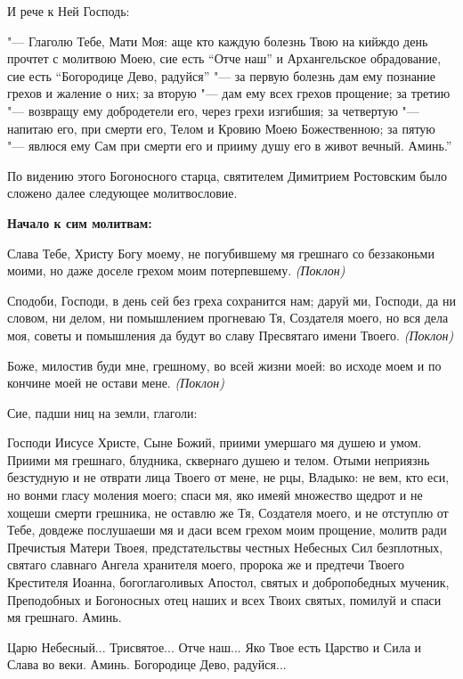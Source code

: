И рече к Ней Господь:


"--- Глаголю Тебе, Мати Моя: аще кто каждую болезнь Твою на кийждо день прочтет с молитвою Моею, сие есть “Отче наш” и Архангельское обрадование, сие есть “Богородице Дево, радуйся” "--- за первую болезнь дам ему познание грехов и жаление о них; за вторую "--- дам ему всех грехов прощение; за третию "--- возвращу ему добродетели его, через грехи изгибшия; за четвертую "--- напитаю его, при смерти его, Телом и Кровию Моею Божественною; за пятую "--- явлюся ему Сам при смерти его и прииму душу его в живот вечный. Аминь.”


По видению этого Богоносного старца, святителем Димитрием Ростовским было сложено далее следующее молитвословие.


\medskip


\bfseries Начало к сим   молитвам:\normalfont{}\nopagebreak


Слава Тебе, Христу Богу моему, не погубившему мя грешнаго со беззаконьми моими, но даже доселе грехом моим потерпевшему. \itshape (Поклон)

\normalfont{}Сподоби, Господи, в день сей без греха сохранится нам; даруй ми, Господи, да ни словом, ни делом, ни помышлением прогневаю Тя, Создателя моего, но вся дела моя, советы и помышления да будут во славу Пресвятаго имени Твоего. \itshape (Поклон)

\normalfont{}Боже, милостив буди мне, грешному, во всей жизни моей: во исходе моем и по кончине моей не остави мене. \itshape (Поклон)

Сие, падши ниц на земли, глаголи:

\normalfont{}Господи Иисусе Христе, Сыне Божий, приими умершаго мя душею и умом. Приими мя грешнаго, блудника, сквернаго душею и телом. Отыми неприязнь безстудную и не отврати лица Твоего от мене, не рцы, Владыко: не вем, кто еси, но вонми гласу моления моего; спаси мя, яко имеяй множество щедрот и не хощеши смерти грешника, не оставлю же Тя, Создателя моего, и не отступлю от Тебе, довдеже послушаеши мя и даси всем грехом моим прощение, молитв ради Пречистыя Матери Твоея, предстательствы честных Небесных Сил безплотных, святаго славнаго Ангела хранителя моего, пророка же и предтечи Твоего Крестителя Иоанна, богоглаголивых Апостол, святых и добропобедных мученик, Преподобных и Богоносных отец наших и всех Твоих святых, помилуй и спаси мя грешнаго. Аминь.

Царю Небесный... Трисвятое... Отче наш... Яко Твое есть Царство и Сила и Слава во веки. Аминь. Богородице Дево, радуйся...


